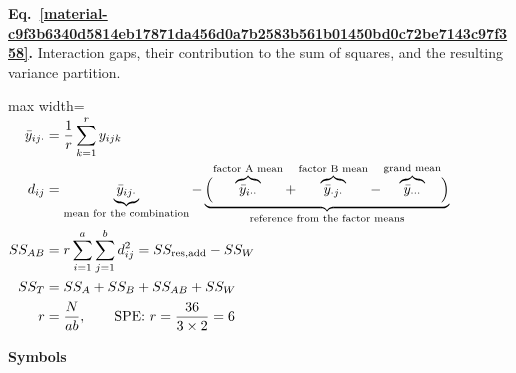 \documentclass[11pt,a4paper]{article}
\begin{document}
\par\medskip
\noindent\begin{minipage}{\linewidth}
\label{material-c9f3b6340d5814eb17871da456d0a7b2583b561b01450bd0c72be7143c97f358}
\noindent\textbf{Eq.~\ref*{material-c9f3b6340d5814eb17871da456d0a7b2583b561b01450bd0c72be7143c97f358}.} Interaction gaps, their contribution to the sum of squares, and the resulting variance partition.\par\nopagebreak
\begin{center}\begin{adjustbox}{max width=\linewidth}$\displaystyle \begin{aligned}
\bar y_{ij\cdot}&=\frac{1}{r}\sum_{k=1}^{r}y_{ijk}\\
d_{ij}&=\underbrace{\bar y_{ij\cdot}}_{\text{mean for the combination}}-\underbrace{\Bigl(\overbrace{\bar y_{i\cdot\cdot}}^{\text{factor A mean}}+\overbrace{\bar y_{\cdot j\cdot}}^{\text{factor B mean}}-\overbrace{\bar y_{\cdot\cdot\cdot}}^{\text{grand mean}}\Bigr)}_{\text{reference from the factor means}}\\
SS_{AB}&=r\sum_{i=1}^{a}\sum_{j=1}^{b}d_{ij}^{2}=SS_{\mathrm{res,add}}-SS_W\\
SS_T&=SS_A+SS_B+SS_{AB}+SS_W
\\r&=\frac{N}{ab},\qquad \text{SPE: }r=\frac{36}{3\times 2}=6
\end{aligned}$\end{adjustbox}\end{center}

\par\noindent\textbf{Symbols}


\end{minipage}
\end{document}
